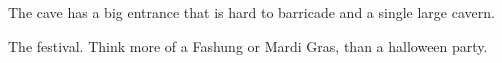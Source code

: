 \documentclass[letterpaper,twocolumn,openany,nodeprecatedcode]{dndbook}
\begin{document}
The cave has a big entrance that is hard to barricade and a single large cavern.


The festival. Think more of a Fashung or Mardi Gras, than a halloween party.

\end{document}
